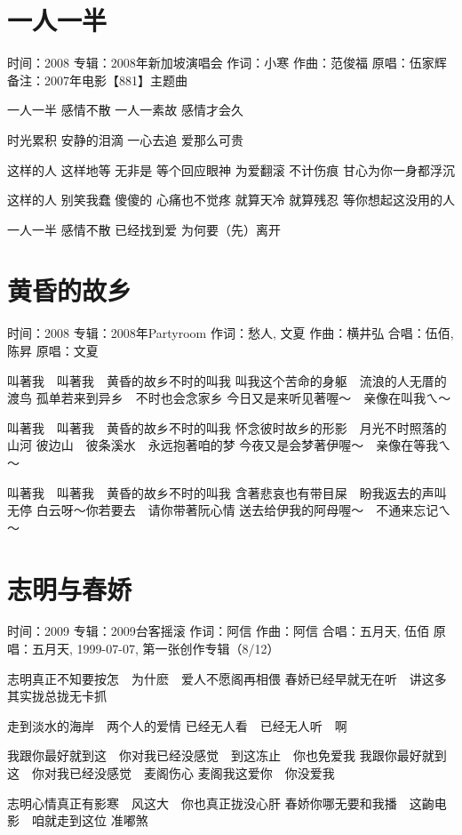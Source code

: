 \documentclass[UTF8,a4paper,oneside,twocolumn,12pt]{ctexbook}
\newcommand{\infopair}[2]{\textbullet #1：#2}
\newcommand{\zc}[1][伍佰]{\infopair{作词}{#1}}
\newcommand{\zq}[1][伍佰]{\infopair{作曲}{#1}}
\newcommand{\zj}[1]{\infopair{专辑}{#1}}
\newcommand{\yc}[1]{\infopair{原唱}{#1}}
\newcommand{\sj}[1]{\infopair{时间}{#1}}
\newcommand{\bz}[1]{\infopair{备注}{#1}}
\newenvironment{info}{\begin{flushleft}\kaishu
	}
	{\end{flushleft}\normalsize\yahei\par}
\newenvironment{lyric}{
	}
{}
\begin{document}
\section{一人一半}
\begin{info}
	\sj{2008}
	\zj{2008年新加坡演唱会}
	\zc[小寒]
	\zq[范俊福]
	\yc{伍家辉}
	\bz{2007年电影【881】主题曲}
\end{info}
\begin{lyric}
	一人一半 感情不散
	一人一素故 感情才会久

	时光累积 安静的泪滴
	一心去追 爱那么可贵

	这样的人 这样地等
	无非是 等个回应眼神
	为爱翻滚 不计伤痕
	甘心为你一身都浮沉

	这样的人 别笑我蠢
	傻傻的 心痛也不觉疼
	就算天冷 就算残忍
	等你想起这没用的人

	一人一半 感情不散
	已经找到爱 为何要（先）离开
\end{lyric}

\section{黄昏的故乡}
\begin{info}
	\sj{2008}
	\zj{2008年Partyroom}
	\zc[愁人, 文夏]
	\zq[横井弘]
	\infopair{合唱}{伍佰, 陈昇}
	\yc{文夏}
\end{info}
\begin{lyric}
	叫著我　叫著我　黄昏的故乡不时的叫我
	叫我这个苦命的身躯　流浪的人无厝的渡鸟
	孤单若来到异乡　不时也会念家乡
	今日又是来听见著喔～　亲像在叫我ㄟ～

	叫著我　叫著我　黄昏的故乡不时的叫我
	怀念彼时故乡的形影　月光不时照落的山河
	彼边山　彼条溪水　永远抱著咱的梦
	今夜又是会梦著伊喔～　亲像在等我ㄟ～

	叫著我　叫著我　黄昏的故乡不时的叫我
	含著悲哀也有带目屎　盼我返去的声叫无停
	白云呀～你若要去　请你带著阮心情
	送去给伊我的阿母喔～　不通来忘记ㄟ～
\end{lyric}

\section{志明与春娇}
\begin{info}
	\sj{2009}
	\zj{2009台客摇滚}
	\zc[阿信]
	\zq[阿信]
	\infopair{合唱}{五月天, 伍佰}
	\yc{五月天, 1999-07-07, 第一张创作专辑（8/12）}
\end{info}
\begin{lyric}
	志明真正不知要按怎　为什麽　爱人不愿阁再相偎
	春娇已经早就无在听　讲这多　其实拢总拢无卡抓

	走到淡水的海岸　两个人的爱情
	已经无人看　已经无人听　啊

	我跟你最好就到这　你对我已经没感觉　到这冻止　你也免爱我
	我跟你最好就到这　你对我已经没感觉　麦阁伤心
	麦阁我这爱你　你没爱我

	志明心情真正有影寒　风这大　你也真正拢没心肝
	春娇你哪无要和我播　这齣电影　咱就走到这位  准嘟煞
\end{lyric}
\end{document}
